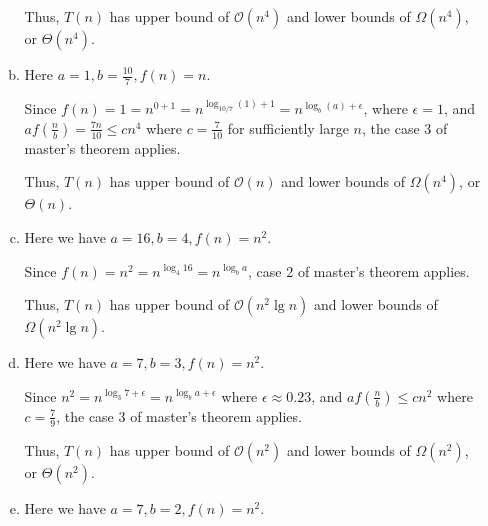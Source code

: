 \documentclass[12pt]{article}
\begin{document}
\begin{enumerate}[1.]
\begin{enumerate}[a)]
        \bigskip

        Thus, $T(n)$ has upper bound of $\mathcal{O}(n^4)$ and lower bounds of $\Omega(n^4)$, or $\Theta(n^4)$.

        \bigskip

        \item

        Here $a = 1, b = \frac{10}{7}, f(n) = n$.

        \bigskip

        Since $f(n) = 1 = n^{0 + 1} = n^{\log_{10/7} (1) + 1}=n^{\log_b (a) + \epsilon}$, where $\epsilon = 1$,
        and $af(\frac{n}{b}) =\frac{7n}{10} \leq cn^4$ where
        $c = \frac{7}{10}$ for sufficiently large $n$, the case 3 of master's theorem applies.

        \bigskip

        Thus, $T(n)$ has upper bound of $\mathcal{O}(n)$ and lower bounds of $\Omega(n^4)$, or $\Theta(n)$.

        \bigskip

        \item

        Here we have $a = 16, b = 4, f(n) = n^2$.

        \bigskip

        Since $f(n) = n^2 = n^{\log_4 16} = n^{\log_b a}$, case 2 of master's theorem applies.

        \bigskip

        Thus, $T(n)$ has upper bound of $\mathcal{O}(n^2 \lg n)$ and lower bounds of $\Omega(n^2 \lg n)$.

        \bigskip

        \item

        Here we have $a = 7, b = 3, f(n) = n^2$.

        \bigskip

        Since $n^2 = n^{\log_3 7 + \epsilon} = n^{\log_b a + \epsilon}$ where $\epsilon \approx 0.23$,
        and $af(\frac{n}{b}) \leq cn^2$ where $c = \frac{7}{9}$, the case 3 of master's theorem applies.

        \bigskip

        Thus, $T(n)$ has upper bound of $\mathcal{O}(n^2)$ and lower bounds of $\Omega(n^2)$, or $\Theta(n^2)$.

        \bigskip

        \item

        Here we have $a = 7, b = 2, f(n) = n^2$.


\end{enumerate}
\end{enumerate}
\end{document}
